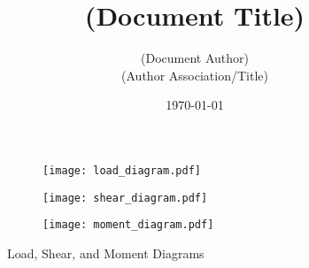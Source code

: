 \documentclass[12pt]{article}
\title{\textbf{(Document Title)}}
\author{(Document Author) \\ (Author Association/Title)}
\date{\today}
\begin{document}
\maketitle

\begin{figure}
	\centering
	\begin{subfigure}{1.0\textwidth}
		\texttt{[image: load\_diagram.pdf]}
	\end{subfigure}
        \vspace{1em}
	\begin{subfigure}{1.0\textwidth}
		\texttt{[image: shear\_diagram.pdf]}
	\end{subfigure}
        \vspace{1em}
	\begin{subfigure}{1.0\textwidth}
		\texttt{[image: moment\_diagram.pdf]}
	\end{subfigure}
	\caption{Load, Shear, and Moment Diagrams}
\end{figure}
\end{document}

